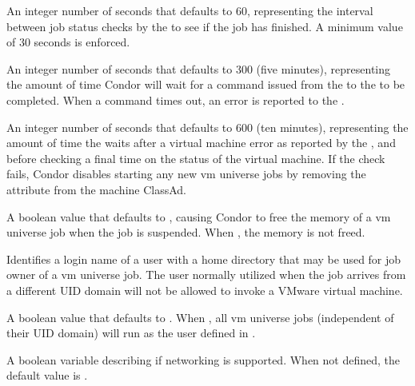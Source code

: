 \begin{description}
\label{param:VMStatusInterval}
\item[\Macro{VM\_STATUS\_INTERVAL}]
  An integer number of seconds that defaults to 60,
  representing the interval between job status checks by the
   to see if the job has finished.
  A minimum value of 30 seconds is enforced.

\label{param:VMGAHPReqTimeout}
\item[\Macro{VM\_GAHP\_REQ\_TIMEOUT}]
  An integer number of seconds that defaults to 300 (five minutes),
  representing the amount of time Condor will wait for a command issued
  from the  to the  to be completed.
  When a command times out, an error is reported to the .

\label{param:VMRecheckInterval}
\item[\Macro{VM\_RECHECK\_INTERVAL}]
  An integer number of seconds that defaults to 600 (ten minutes),
  representing the amount of time the  waits after a
  virtual machine error as reported by the ,
  and before checking a final time on the status of the virtual machine.
  If the check fails, Condor disables starting any new vm universe jobs
  by removing the  attribute from the machine ClassAd.

\label{param:VMSoftSuspend}
\item[\Macro{VM\_SOFT\_SUSPEND}]
  A boolean value that defaults to ,
  causing Condor to free the memory of a vm universe job when
  the job is suspended.
  When , the memory is not freed.

\label{param:VMUnivNobodyUser}
\item[\Macro{VM\_UNIV\_NOBODY\_USER}]
  Identifies a login name of a user with a home directory that
  may be used for job owner of a vm universe job.
  The  user normally utilized when the job arrives
  from a different UID domain will not be allowed to invoke a VMware
  virtual machine.

\label{param:AlwaysVMUnivUseNobody}
\item[\Macro{ALWAYS\_VM\_UNIV\_USE\_NOBODY}]
  A boolean value that defaults to .
  When , all vm universe jobs (independent of their
  UID domain) will run as the user defined in .

\label{param:VMNetworking}
\item[\Macro{VM\_NETWORKING}]
  A boolean variable describing if networking is supported.
  When not defined, the default value is .


\end{description}
